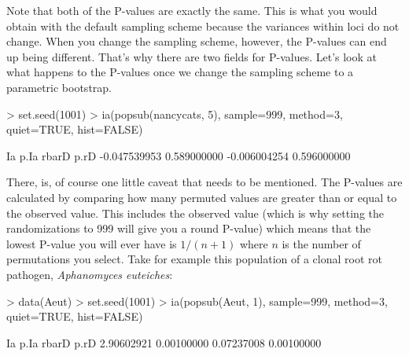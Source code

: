 \documentclass[letterpaper]{article}
\begin{document}
Note that both of the P-values are exactly the same. This is what you would obtain with the default sampling scheme because the variances within loci do not change. When you change the sampling scheme, however, the P-values can end up being different. That's why there are two fields for P-values. Let's look at what happens to the P-values once we change the sampling scheme to a parametric bootstrap.
\begin{Schunk}
\begin{Sinput}
> set.seed(1001)
> ia(popsub(nancycats, 5), sample=999, method=3, quiet=TRUE, hist=FALSE)
\end{Sinput}
\end{Schunk}
\begin{Schunk}
\begin{Soutput}
          Ia         p.Ia        rbarD         p.rD 
-0.047539953  0.589000000 -0.006004254  0.596000000 
\end{Soutput}
\end{Schunk}
There, is, of course one little caveat that needs to be mentioned. The P-values are calculated by comparing how many permuted values are greater than or equal to the observed value. This includes the observed value (which is why setting the randomizations to 999 will give you a round P-value) which means that the lowest P-value you will ever have is $1/(n+1)$ where $n$ is the number of permutations you select. Take for example this population of a clonal root rot pathogen, \textit{Aphanomyces euteiches}:
\begin{Schunk}
\begin{Sinput}
> data(Aeut)
> set.seed(1001)
> ia(popsub(Aeut, 1), sample=999, method=3, quiet=TRUE, hist=FALSE)
\end{Sinput}
\end{Schunk}
\begin{Schunk}
\begin{Soutput}
        Ia       p.Ia      rbarD       p.rD 
2.90602921 0.00100000 0.07237008 0.00100000 
\end{Soutput}
\end{Schunk}
\end{document}
